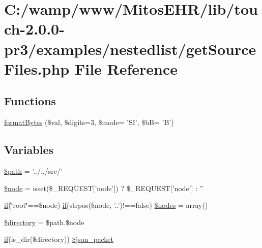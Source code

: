 \hypertarget{get_source_files_8php}{\section{\-C\-:/wamp/www/\-Mitos\-E\-H\-R/lib/touch-\/2.0.0-\/pr3/examples/nestedlist/get\-Source\-Files.php \-File \-Reference}
\label{get_source_files_8php}
}
\subsection*{\-Functions}
\begin{DoxyCompactItemize}
\item 
\hyperlink{get_source_files_8php_a590cce67028d48090caf310024c3b824}{format\-Bytes} (\$val, \$digits=3, \$mode= '\-S\-I', \$b\-B= '\-B')
\end{DoxyCompactItemize}
\subsection*{\-Variables}
\begin{DoxyCompactItemize}
\item 
\hyperlink{get_source_files_8php_a0a4baf0b22973c07685c3981f0d17fc4}{\$path} = '../../src/'
\item 
\hyperlink{get_source_files_8php_a15955933e72700564e1a76d7f97c1ac7}{\$node} = isset(\$\-\_\-\-R\-E\-Q\-U\-E\-S\-T\mbox{[}'node'\mbox{]}) ? \$\-\_\-\-R\-E\-Q\-U\-E\-S\-T\mbox{[}'node'\mbox{]} \-: ''
\item 
\hyperlink{_setup_8inc_8php_ad0184337b31d13763ec8751feff4aabe}{if}(\char`\"{}root\char`\"{}==\$node) \hyperlink{_setup_8inc_8php_ad0184337b31d13763ec8751feff4aabe}{if}(strpos(\$node, \*
'..')!==false) \hyperlink{get_source_files_8php_ad5596e0a4e420824f31139ebceb00567}{\$nodes} = array()
\item 
\hyperlink{get_source_files_8php_a1b07c630eb02f770a082a013373a16d6}{\$directory} = \$path.\$node
\item 
\hyperlink{_setup_8inc_8php_ad0184337b31d13763ec8751feff4aabe}{if}(is\-\_\-dir(\$directory)) \hyperlink{get_source_files_8php_a108774637bb95516727a0c29e580525e}{\$json\-\_\-packet}
\end{DoxyCompactItemize}



